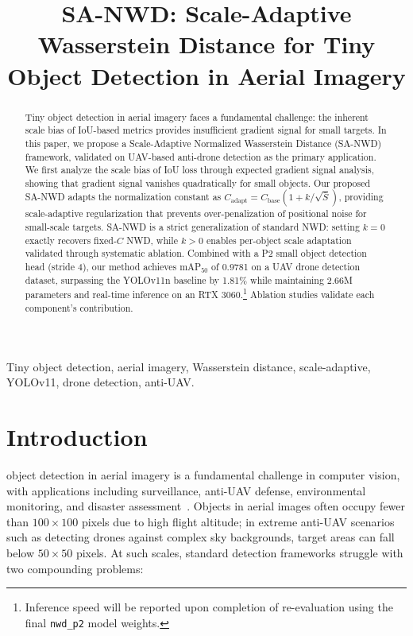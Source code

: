 \documentclass[journal]{IEEEtran}
\title{SA-NWD: Scale-Adaptive Wasserstein Distance for Tiny Object Detection in Aerial Imagery}
\author{
  \IEEEauthorblockN{First Author\IEEEauthorrefmark{1}, Second Author\IEEEauthorrefmark{1}, Third Author\IEEEauthorrefmark{1}}
  \IEEEauthorblockA{\IEEEauthorrefmark{1}School of XXX, XXX University, City, China \\
  Email: \{author1, author2, author3\}@xxx.edu.cn}
}
\begin{document}
\maketitle

\begin{abstract}
Tiny object detection in aerial imagery faces a fundamental challenge: the inherent scale bias of IoU-based metrics provides insufficient gradient signal for small targets. In this paper, we propose a Scale-Adaptive Normalized Wasserstein Distance (SA-NWD) framework, validated on UAV-based anti-drone detection as the primary application. We first analyze the scale bias of IoU loss through expected gradient signal analysis, showing that gradient signal vanishes quadratically for small objects. Our proposed SA-NWD adapts the normalization constant as $C_{\text{adapt}} = C_{\text{base}}(1+k/\sqrt{\bar{S}})$, providing scale-adaptive regularization that prevents over-penalization of positional noise for small-scale targets. SA-NWD is a strict generalization of standard NWD: setting $k=0$ exactly recovers fixed-$C$ NWD, while $k>0$ enables per-object scale adaptation validated through systematic ablation. Combined with a P2 small object detection head (stride 4), our method achieves mAP$_{50}$ of 0.9781 on a UAV drone detection dataset, surpassing the YOLOv11n baseline by 1.81\% while maintaining 2.66M parameters and real-time inference on an RTX 3060.\footnote{Inference speed will be reported upon completion of re-evaluation using the final \texttt{nwd\_p2} model weights.} Ablation studies validate each component's contribution.
\end{abstract}

\begin{IEEEkeywords}
Tiny object detection, aerial imagery, Wasserstein distance, scale-adaptive, YOLOv11, drone detection, anti-UAV.
\end{IEEEkeywords}

\section{Introduction}

 object detection in aerial imagery is a fundamental challenge in computer vision, with applications including surveillance, anti-UAV defense, environmental monitoring, and disaster assessment~\cite{wang2022aitod}. Objects in aerial images often occupy fewer than $100 \times 100$ pixels due to high flight altitude; in extreme anti-UAV scenarios such as detecting drones against complex sky backgrounds, target areas can fall below $50 \times 50$ pixels. At such scales, standard detection frameworks struggle with two compounding problems:
\end{document}
